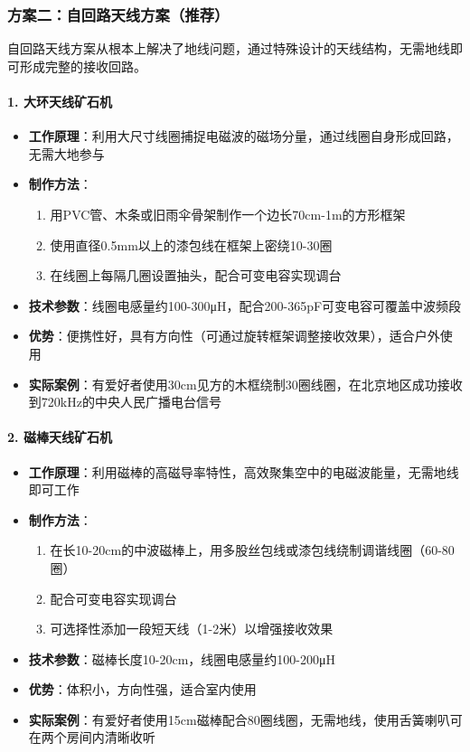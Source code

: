 \documentclass[12pt,UTF8]{ctexbook}
\begin{document}
\subsubsection{方案二：自回路天线方案（推荐）}

自回路天线方案从根本上解决了地线问题，通过特殊设计的天线结构，无需地线即可形成完整的接收回路。

\paragraph{1. 大环天线矿石机}
\begin{itemize}[leftmargin=3.5em]
    \item \textbf{工作原理}：利用大尺寸线圈捕捉电磁波的磁场分量，通过线圈自身形成回路，无需大地参与
    \item \textbf{制作方法}：
        \begin{enumerate}
            \item 用PVC管、木条或旧雨伞骨架制作一个边长70cm-1m的方形框架
            \item 使用直径0.5mm以上的漆包线在框架上密绕10-30圈
            \item 在线圈上每隔几圈设置抽头，配合可变电容实现调台
        \end{enumerate}
    \item \textbf{技术参数}：线圈电感量约100-300μH，配合200-365pF可变电容可覆盖中波频段
    \item \textbf{优势}：便携性好，具有方向性（可通过旋转框架调整接收效果），适合户外使用
    \item \textbf{实际案例}：有爱好者使用30cm见方的木框绕制30圈线圈，在北京地区成功接收到720kHz的中央人民广播电台信号
\end{itemize}

\paragraph{2. 磁棒天线矿石机}
\begin{itemize}[leftmargin=3.5em]
    \item \textbf{工作原理}：利用磁棒的高磁导率特性，高效聚集空中的电磁波能量，无需地线即可工作
    \item \textbf{制作方法}：
        \begin{enumerate}
            \item 在长10-20cm的中波磁棒上，用多股丝包线或漆包线绕制调谐线圈（60-80圈）
            \item 配合可变电容实现调台
            \item 可选择性添加一段短天线（1-2米）以增强接收效果
        \end{enumerate}
    \item \textbf{技术参数}：磁棒长度10-20cm，线圈电感量约100-200μH
    \item \textbf{优势}：体积小，方向性强，适合室内使用
    \item \textbf{实际案例}：有爱好者使用15cm磁棒配合80圈线圈，无需地线，使用舌簧喇叭可在两个房间内清晰收听
\end{itemize}
\end{document}
